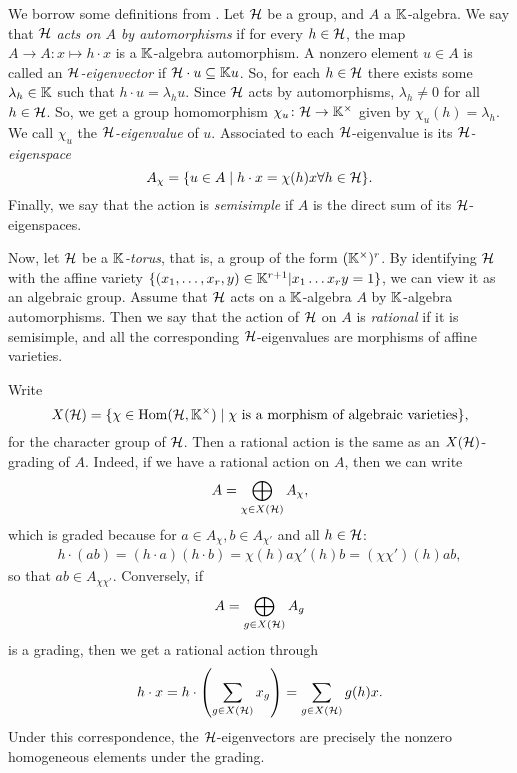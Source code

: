 \documentclass{article}
\begin{document}
We borrow some definitions from \cite{GoodearlBrown2002LecturesAQC}. Let $\mathcal{H}$ be a
group, and $A$ a $\mathbb{K}$-algebra. We say that $\mathcal{H}$ \emph{acts on $A$ by
	automorphisms} if for every $h \in \mathcal{H}$, the map $A \to
	A \colon x \mapsto h \cdot x$ is a $\mathbb{K}$-algebra automorphism. A nonzero element $u
	\in A$ is called an \emph{$\mathcal{H}$-eigenvector} if $\mathcal{H}
	\cdot u \subseteq \mathbb{K} u$. So, for each $h \in \mathcal{H}$ there exists some $\lambda_h \in
	\mathbb{K}$ such that $h \cdot u = \lambda_h u$. Since $\mathcal{H}$ acts by automorphisms,
$\lambda_h \neq 0$ for all $h \in \mathcal{H}$. So, we get a group homomorphism $\chi_u \colon
	\mathcal{H} \to \mathbb{K}^\times$ given by $\chi_u(h) = \lambda_h$. We call $\chi_u$ the
\emph{$\mathcal{H}$-eigenvalue} of $u$. Associated to each
$\mathcal{H}$-eigenvalue is its \emph{$\mathcal{H}$-eigenspace}
\begin{equation*}
	A_\chi = \{u \in A \mid h \cdot x = \chi(h)x \forall h \in \mathcal{H} \}.
\end{equation*}
%
Finally, we say that the action is \emph{semisimple} if $A$ is
the direct sum of its $\mathcal{H}$-eigenspaces.

Now, let $\mathcal{H}$ be a \emph{$\mathbb{K}$-torus}, that is, a group of the form
$(\mathbb{K}^\times)^r$. By identifying $\mathcal{H}$ with the affine variety $\{(x_1, \dots, x_r,
	y) \in \mathbb{K}^{r+1} | x_1 \dots x_r y = 1\}$, we can view it as an algebraic group.
Assume that $\mathcal{H}$ acts on a $\mathbb{K}$-algebra $A$ by $\mathbb{K}$-algebra automorphisms. Then
we say that the action of $\mathcal{H}$ on $A$ is \emph{rational} if it
is semisimple, and all the corresponding $\mathcal{H}$-eigenvalues are morphisms of affine
varieties.

Write
\begin{equation*}
	X(\mathcal{H}) = \{\chi \in \operatorname{Hom}(\mathcal{H}, \mathbb{K}^\times) \mid \chi \text{ is a morphism of algebraic varieties}\},
\end{equation*}
%
for the character group of $\mathcal{H}$. Then a rational action is the
same as an $X(\mathcal{H})$-grading of $A$. Indeed, if we have a rational
action on $A$, then we can write
\begin{equation*}
	A = \bigoplus_{\chi \in X(\mathcal{H})} A_\chi,
\end{equation*}
which is graded because for $a \in A_\chi, b \in A_{\chi'}$ and all $h \in \mathcal{H}$:
\begin{align*}
	h \cdot (a b) = (h\cdot a)(h\cdot b)= \chi(h)a \chi'(h)b = (\chi \chi')(h)ab,
\end{align*}
so that $ab \in A_{\chi \chi'}$. Conversely, if
\begin{equation*}
	A = \bigoplus_{g \in X(\mathcal{H})} A_g
\end{equation*}
is a grading, then we get a rational action through
\begin{equation*}
	h \cdot x = h \cdot \left(\sum_{g \in X(\mathcal{H})} x_g \right) = \sum_{g \in X(\mathcal{H})} g(h)x.
\end{equation*}
%
Under this correspondence, the $\mathcal{H}$-eigenvectors are precisely the nonzero
homogeneous elements under the grading.
\end{document}
